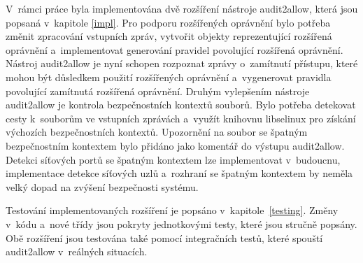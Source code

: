 V~rámci práce byla implementována dvě rozšíření nástroje audit2allow, která jsou
po\-psa\-ná v~kapitole \ref{impl}. Pro podporu rozšířených oprávnění bylo potřeba
změnit zpracování vstup\-ních zpráv, vytvořit objekty reprezentující rozšířená
oprávnění a~implementovat ge\-ne\-ro\-vá\-ní pravidel povolující rozšířená
oprávnění. Nástroj audit2allow je nyní schopen rozpoznat zprávy o~zamítnutí
přístupu, které mohou být důsledkem použití rozšířených oprávnění a~vygenerovat
pravidla povolující zamítnutá rozšířená oprávnění. Druhým vylepšením nástroje
audit2allow je kontrola bezpečnostních kontextů souborů. Bylo potřeba detekovat
cesty k~souborům ve vstupních zprávách a~využít knihovnu libselinux pro získání
výchozích bezpečnostních kontextů. Upozornění na soubor se špatným bezpečnostním
kontextem bylo přidáno jako komentář do výstupu audit2allow. Detekci síťových
portů se špatným kontextem lze implementovat v~budoucnu, implementace detekce
síťových uzlů a~rozhraní se špatným kontextem by neměla velký dopad na zvýšení
bezpečnosti systému.

Testování implementovaných rozšíření je popsáno v~kapitole~\ref{testing}. Změny
v~kódu a~nové třídy jsou pokryty jednotkovými testy, které jsou stručně popsány.
Obě rozšíření jsou testována také pomocí integračních testů, které spouští
audit2allow v~reálných situacích.

